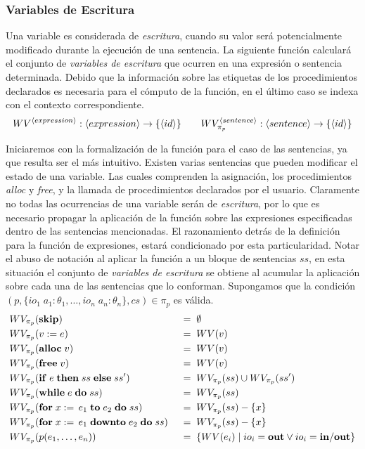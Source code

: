 \subsubsection{Variables de Escritura}

Una variable es considerada de \textit{escritura}, cuando su valor será potencialmente modificado durante la ejecución de una sentencia.
La siguiente función calculará el conjunto de \textit{variables de escritura} que ocurren en una expresión o sentencia determinada.
Debido que la información sobre las etiquetas de los procedimientos declarados es necesaria para el cómputo de la función, en el último caso se indexa con el contexto correspondiente.
\begin{gather*}
WV^{\langle expression \rangle}: \langle expression \rangle \rightarrow \{ \langle id \rangle \}
\qquad
WV^{\langle sentence \rangle}_{\pi_{p}}: \langle sentence \rangle \rightarrow \{ \langle id \rangle \}
\end{gather*}

Iniciaremos con la formalización de la función para el caso de las sentencias, ya que resulta ser el más intuitivo.
Existen varias sentencias que pueden modificar el estado de una variable.
Las cuales comprenden la asignación, los procedimientos \textit{alloc} y \textit{free}, y la llamada de procedimientos declarados por el usuario.
Claramente no todas las ocurrencias de una variable serán de \textit{escritura}, por lo que es necesario propagar la aplicación de la función sobre las expresiones especificadas dentro de las sentencias mencionadas.
El razonamiento detrás de la definición para la función de expresiones, estará condicionado por esta particularidad.
Notar el abuso de notación al aplicar la función a un bloque de sentencias $ss$, en esta situación el conjunto de \textit{variables de escritura} se obtiene al acumular la aplicación sobre cada una de las sentencias que lo conforman.
Supongamos que la condición $(p, \{ io_1 \; a_1: \theta_1, \ldots, io_n \; a_n: \theta_n \}, cs) \in \pi_{p}$ es válida.
\begin{alignat*}{2}
&WV_{\pi_{p}}(\mathbf{skip})
&&\;=\;
\emptyset
\\
&WV_{\pi_{p}}(v := e)
&&\;=\;
WV(v)
\\
&WV_{\pi_{p}}(\mathbf{alloc} \; v)
&&\;=\;
WV(v)
\\
&WV_{\pi_{p}}(\mathbf{free} \; v)
&&\;=\;
WV(v)
\\
&WV_{\pi_{p}}(\mathbf{if} \; e \; \mathbf{then} \; ss \; \mathbf{else} \; ss')
&&\;=\;
WV_{\pi_{p}}(ss) \cup WV_{\pi_{p}}(ss')
\\
&WV_{\pi_{p}}(\mathbf{while} \; e \; \mathbf{do} \; ss)
&&\;=\;
WV_{\pi_{p}}(ss)
\\
&WV_{\pi_{p}}(\mathbf{for} \; x := \, e_1 \; \mathbf{to} \; e_2 \; \mathbf{do} \; ss)
&&\;=\;
WV_{\pi_{p}}(ss) - \{ x \}
\\
&WV_{\pi_{p}}(\mathbf{for} \; x := \, e_1 \; \mathbf{downto} \; e_2 \; \mathbf{do} \; ss)
&&\;=\;
WV_{\pi_{p}}(ss) - \{ x \}
\\
&WV_{\pi_{p}}(p(e_1, \ldots, e_n))
&&\;=\;
\{ WV(e_i) \mid io_i = \mathbf{out} \vee io_i = \mathbf{in/out} \}
\end{alignat*}

